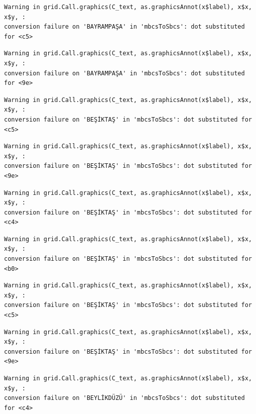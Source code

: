 \documentclass[
  11pt,
  a4paper,
  DIV=11,
  numbers=noendperiod]{scrartcl}
\begin{document}
\begin{verbatim}
Warning in grid.Call.graphics(C_text, as.graphicsAnnot(x$label), x$x, x$y, :
conversion failure on 'BAYRAMPAŞA' in 'mbcsToSbcs': dot substituted for <c5>
\end{verbatim}

\begin{verbatim}
Warning in grid.Call.graphics(C_text, as.graphicsAnnot(x$label), x$x, x$y, :
conversion failure on 'BAYRAMPAŞA' in 'mbcsToSbcs': dot substituted for <9e>
\end{verbatim}

\begin{verbatim}
Warning in grid.Call.graphics(C_text, as.graphicsAnnot(x$label), x$x, x$y, :
conversion failure on 'BEŞİKTAŞ' in 'mbcsToSbcs': dot substituted for <c5>
\end{verbatim}

\begin{verbatim}
Warning in grid.Call.graphics(C_text, as.graphicsAnnot(x$label), x$x, x$y, :
conversion failure on 'BEŞİKTAŞ' in 'mbcsToSbcs': dot substituted for <9e>
\end{verbatim}

\begin{verbatim}
Warning in grid.Call.graphics(C_text, as.graphicsAnnot(x$label), x$x, x$y, :
conversion failure on 'BEŞİKTAŞ' in 'mbcsToSbcs': dot substituted for <c4>
\end{verbatim}

\begin{verbatim}
Warning in grid.Call.graphics(C_text, as.graphicsAnnot(x$label), x$x, x$y, :
conversion failure on 'BEŞİKTAŞ' in 'mbcsToSbcs': dot substituted for <b0>
\end{verbatim}

\begin{verbatim}
Warning in grid.Call.graphics(C_text, as.graphicsAnnot(x$label), x$x, x$y, :
conversion failure on 'BEŞİKTAŞ' in 'mbcsToSbcs': dot substituted for <c5>
\end{verbatim}

\begin{verbatim}
Warning in grid.Call.graphics(C_text, as.graphicsAnnot(x$label), x$x, x$y, :
conversion failure on 'BEŞİKTAŞ' in 'mbcsToSbcs': dot substituted for <9e>
\end{verbatim}

\begin{verbatim}
Warning in grid.Call.graphics(C_text, as.graphicsAnnot(x$label), x$x, x$y, :
conversion failure on 'BEYLİKDÜZÜ' in 'mbcsToSbcs': dot substituted for <c4>
\end{verbatim}
\end{document}
